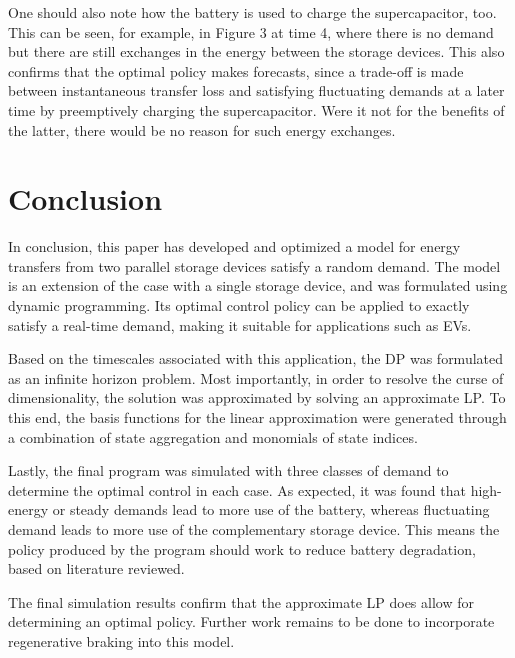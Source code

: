 \documentclass[conference]{IEEEtran}
\begin{document}
One should also note how the battery is used to charge the supercapacitor, too. This can be seen, for example, in Figure 3 at time 4, where there is no demand but there are still exchanges in the energy between the storage devices. This also confirms that the optimal policy makes forecasts, since a trade-off is made between instantaneous transfer loss and satisfying fluctuating demands at a later time by preemptively charging the supercapacitor. Were it not for the benefits of the latter, there would be no reason for such energy exchanges.





\section{Conclusion}
In conclusion, this paper has developed and optimized a model for energy transfers from two parallel storage devices satisfy a random demand. The model is an extension of the case with a single storage device, and was formulated using dynamic programming. Its optimal control policy can be applied to exactly satisfy a real-time demand, making it suitable for applications such as EVs.

Based on the timescales associated with this application, the DP was formulated as an infinite horizon problem. Most importantly, in order to resolve the curse of dimensionality, the solution was approximated by solving an approximate LP. To this end, the basis functions for the linear approximation were generated through a combination of state aggregation and monomials of state indices.

Lastly, the final program was simulated with three classes of demand to determine the optimal control in each case. As expected, it was found that high-energy or steady demands lead to more use of the battery, whereas fluctuating demand leads to more use of the complementary storage device. This means the policy produced by the program should work to reduce battery degradation, based on literature reviewed.

The final simulation results confirm that the approximate LP does allow for determining an optimal policy. Further work remains to be done to incorporate regenerative braking into this model.

\printbibliography
\end{document}
